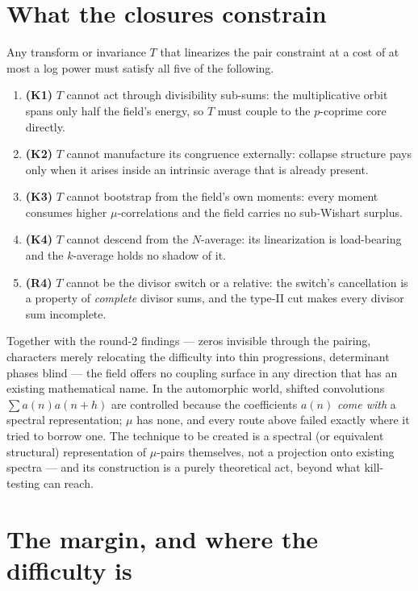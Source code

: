 \documentclass[11pt,a4paper]{article}
\theoremstyle{plain}
\theoremstyle{definition}
\begin{document}
\section{What the closures constrain}

Any transform or invariance $T$ that linearizes the pair constraint at
a cost of at most a log power must satisfy all five of the following.

\begin{enumerate}
\item \textbf{(K1)} $T$ cannot act through divisibility sub-sums: the
  multiplicative orbit spans only half the field's energy, so $T$ must
  couple to the $p$-coprime core directly.
\item \textbf{(K2)} $T$ cannot manufacture its congruence externally:
  collapse structure pays only when it arises inside an intrinsic
  average that is already present.
\item \textbf{(K3)} $T$ cannot bootstrap from the field's own moments:
  every moment consumes higher $\mu$-correlations and the field
  carries no sub-Wishart surplus.
\item \textbf{(K4)} $T$ cannot descend from the $N$-average: its
  linearization is load-bearing and the $k$-average holds no shadow
  of it.
\item \textbf{(R4)} $T$ cannot be the divisor switch or a relative:
  the switch's cancellation is a property of \emph{complete} divisor
  sums, and the type-II cut makes every divisor sum incomplete.
\end{enumerate}

\noindent
Together with the round-2 findings --- zeros invisible through the
pairing, characters merely relocating the difficulty into thin
progressions, determinant phases blind --- the field offers no
coupling surface in any direction that has an existing mathematical
name. In the automorphic world, shifted convolutions
$\sum a(n)a(n+h)$ are controlled because the coefficients $a(n)$
\emph{come with} a spectral representation; $\mu$ has none, and every
route above failed exactly where it tried to borrow one. The technique
to be created is a spectral (or equivalent structural) representation
of $\mu$-pairs themselves, not a projection onto existing spectra ---
and its construction is a purely theoretical act, beyond what
kill-testing can reach.

\section{The margin, and where the difficulty is}
\end{document}
